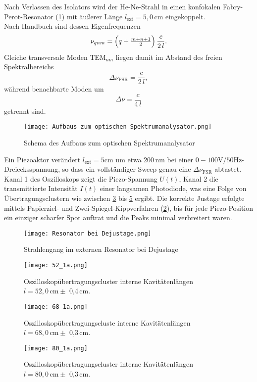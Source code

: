 Nach Verlassen des Isolators wird der He-Ne-Strahl in einen konfokalen Fabry-Perot-Resonator (\cref{fig:Spektrumanalysator}) mit äußerer Länge $l_{\mathrm{ext}} = 5{,}0\,\si{\centi\meter}$ eingekoppelt. \\
Nach Handbuch \cite{praktikum} sind dessen Eigenfrequenzen
\begin{equation}
  \nu_{qnm}
  = \Bigl(q + \tfrac{m+n+1}{2}\Bigr)\,\frac{c}{2\,l} .
\end{equation}
Gleiche transversale Moden TEM$_{nm}$ liegen damit im Abstand des freien Spektralbereichs \cite{praktikum}
\begin{equation*}
  \Delta\nu_{\mathrm{FSR}}
  = \frac{c}{2\,l},
\end{equation*}
während benachbarte Moden um
\begin{equation*}
  \Delta\nu
  = \frac{c}{4\,l}
\end{equation*}
getrennt sind.
\begin{figure}[htbp]
  \centering
  \texttt{[image: Aufbaus zum optischen Spektrumanalysator.png]}
  \caption{Schema des Aufbaus zum optischen Spektrumanalysator \cite{praktikum}}
  \label{fig:Spektrumanalysator}
\end{figure}

Ein Piezoaktor verändert $l_{\mathrm{ext}} = 5 \si{\cm}$ um etwa $200\,\si{\nm}$ bei einer $0-100 \si{\volt}  $/$50 \si{\hertz}$-Dreiecksspannung, so dass ein vollständiger Sweep genau eine $\Delta\nu_{\mathrm{FSR}}$ abtastet. 
Kanal 1 des Oszilloskops zeigt die Piezo-Spannung $U(t)$, Kanal 2 die transmittierte Intensität $I(t)$ einer langsamen Photodiode, was eine Folge von Übertragungsclustern wie zwischen \cref{fig:9a} bis \cref{fig:9c} ergibt. 
Die korrekte Justage erfolgte mittels Papierziel- und Zwei-Spiegel-Kippverfahren (\cref{fig:Resonator}), bis für jede Piezo-Position ein einziger scharfer Spot auftrat und die Peaks minimal verbreitert waren.
\begin{figure}[htbp]
  \centering
  \texttt{[image: Resonator bei Dejustage.png]}
  \caption{Strahlengang im externen Resonator bei Dejustage \cite{praktikum}}
  \label{fig:Resonator}
\end{figure}
\begin{figure}[htbp]
    \centering
    \texttt{[image: 52\_1a.png]}
     \caption{Oszilloskopübertragungscluster interne Kavitätenlängen $l = 52,0\,\si{\centi\meter} \pm$ 0{,}4\,\si{\centi\meter}.}
    \label{fig:9a}
\end{figure}
  \begin{figure}[htbp]
    \centering
    \texttt{[image: 68\_1a.png]}
     \caption{Oszilloskopübertragungscluste interne Kavitätenlängen $l = 68,0\,\si{\centi\meter} \pm$ 0{,}3\,\si{\centi\meter}.}
    \label{fig:9b}
  \end{figure}
  \newpage
  \begin{figure}[htbp]
    \centering
    \texttt{[image: 80\_1a.png]}
     \caption{Oszilloskopübertragungscluster interne Kavitätenlängen $l = 80,0\,\si{\centi\meter} \pm$ 0{,}3\,\si{\centi\meter}.}
    \label{fig:9c}
  \end{figure}
 
